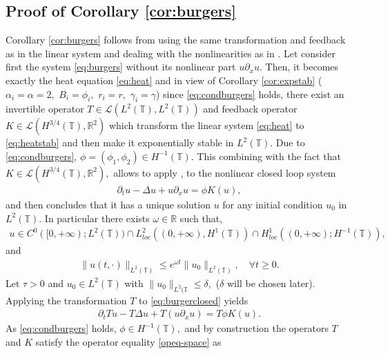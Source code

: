 \documentclass[11pt, dvipsnames]{amsart}
\begin{document}
\subsection{Proof of Corollary \ref{cor:burgers}}\label{sec:appendix-burgers}

Corollary \ref{cor:burgers} follows from using the same transformation and feedback as in the linear system and dealing with the nonlinearities as in \cite{Gagnon2022-fredholm-laplacien}. Let consider first the system \eqref{eq:burgers} without its nonlinear part $u\partial_x u.$ Then, it becomes exactly the heat equation \eqref{eq:heat}  and in view of Corollary \ref{cor:expstab} ($\alpha_i=\alpha=2,$ $B_i=\phi_i,$ $r_i=r,$ $\gamma_i=\gamma$) since \eqref{eq:condburgers} holds, there exist an invertible operator $T\in \mathcal{L}(L^2(\mathbb{T}),L^2(\mathbb{T}))$ and feedback operator $K\in \mathcal{L}(H^{3/4}(\mathbb{T}),\mathbb{R}^2)$
which transform the linear system \eqref{eq:heat} to \eqref{eq:heatstab} and then make it exponentially stable in $L^2(\mathbb{T})$.
Due to \eqref{eq:condburgers}, $\phi=(\phi_1,\phi_2)\in H^{-1}(\mathbb{T}).$ This combining with the fact that $K\in \mathcal{L}(H^{3/4}(\mathbb{T}),\mathbb{R}^2),$ allows to apply \cite[Lemma 5.5]{Gagnon2022-fredholm-laplacien}, to the nonlinear closed loop system
\begin{align}
    \partial_t u-\Delta u+u\partial_x u=\phi K(u),\label{eq:burgerclosed}
\end{align} and then concludes that it has a unique solution $u$ for any initial condition $u_0$ in $L^2(\mathbb{T}).$ In particular there exists $\omega\in \mathbb{R}$ such that,
\begin{align*}
    u\in C^0([0,+\infty);L^2(\mathbb{T}))\cap L^2_{loc}((0,+\infty),H^1(\mathbb{T}))\cap H^1_{loc}((0,+\infty);H^{-1}(\mathbb{T})),
\end{align*} and 
\begin{align}
    \|u(t,\cdot)\|_{L^2(\mathbb{T})}\leq e^{\omega t}\|u_0\|_{L^2(\mathbb{T})}, \quad \forall t\geq 0.\label{ini-burg}
\end{align}
Let $\tau>0$ and $u_0\in L^2(\mathbb{T})$ with $\|u_0\|_{L^2(\mathbb{T}}\leq \delta,$ ($\delta$ will be chosen later). Applying the transformation $T$ to \eqref{eq:burgerclosed} yields
\begin{align}
    \partial_t Tu-T\Delta u+T(u\partial_x u)=T\phi K(u).\label{eq:applyT}
\end{align}
As \eqref{eq:condburgers} holds, $\phi\in H^{-1}(\mathbb{T}),$ and by construction the operators $T$ and $K$ satisfy the operator equality \eqref{opeq-space} as
\end{document}

